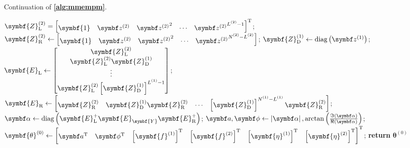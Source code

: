 \begin{algorithm}[H]
    \caption*{Continuation of \textbf{\cref{alg:mmempm}}.}
    \begin{algorithmic}
        \State $
        \symbf{Z}^{(2)}_{\text{L}} =
        \begin{bmatrix}
            \symbf{1} &
            \bdztwo &
            {\bdztwo}^2 &
            \cdots &
            {\bdztwo}^{\Ltwo-1}
        \end{bmatrix}\T
        $;
        \State $
            \symbf{Z}^{(2)}_{\text{R}} \gets
            \begin{bmatrix}
                \symbf{1} & \bdztwo & {\bdztwo}^2 & \cdots & {\bdztwo}^{\Ntwo - \Ltwo}
            \end{bmatrix}
        $;
        \State $\symbf{Z}^{(1)}_{\text{D}} \gets \diag\left(\bdzone\right)$;
       \State $
            \symbf{E}_{\text{L}} \gets
            \begin{bmatrix}
                \symbf{Z}^{(2)}_{\text{L}} \\
                \symbf{Z}^{(2)}_{\text{L}} \symbf{Z}^{(1)}_{\text{D}} \\
                \vdots\\
                \symbf{Z}^{(2)}_{\text{L}} \left[\symbf{Z}^{(1)}_{\text{D}}\right]^{\Lone - 1}
            \end{bmatrix}
        $;
        \State $
            \symbf{E}_{\text{R}} \gets
            \begin{bmatrix}
                \symbf{Z}^{(2)}_{\text{R}} &
                \symbf{Z}^{(1)}_{\text{D}} \symbf{Z}^{(2)}_{\text{R}} &
                \cdots &
                \left[\symbf{Z}^{(1)}_{\text{D}}\right]^{\None - \Lone} \symbf{Z}^{(2)}_{\text{R}}
            \end{bmatrix}
        $;
        \State $
           \bdalpha \gets \diag
           \left(
               \symbf{E}_{\text{L}}^+
               \symbf{E}_{\symbf{Y}}^{\vphantom{+}}
               \symbf{E}_{\text{R}}^+
           \right)
           $;
        \State $
            \bda, \bdphi \gets
            \left\lvert \bdalpha \right\rvert,
            \arctan \left( \frac{\Im\left(\bdalpha\right)}{\Re\left(\bdalpha\right)} \right)
        $;
        \State $\symbf{\theta}^{(0)} \gets
        \begin{bmatrix}
            \bda\T &
            \bdphi\T &
            \left[\symbf{f}^{(1)}\right]\T &
            \left[\symbf{f}^{(2)}\right]\T &
            \left[\symbf{\eta}^{(1)}\right]\T &
            \left[\symbf{\eta}^{(2)}\right]\T
        \end{bmatrix}
        ^{\mathrm{T}}$;
        \State \textbf{return} $\symbf{\theta}^{(0)}$
    \EndProcedure
    \end{algorithmic}
\end{algorithm}
\null\vfill

